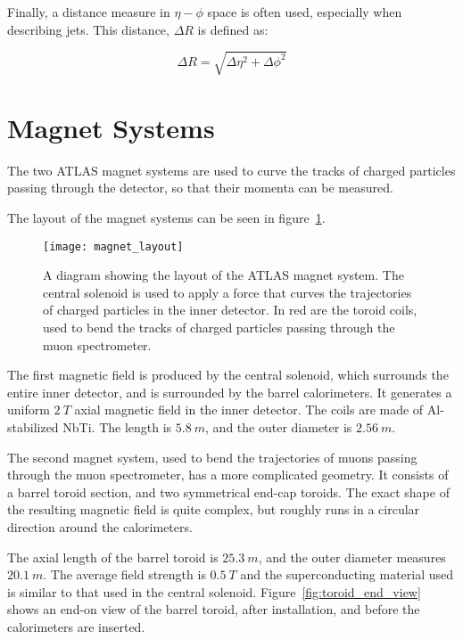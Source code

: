 Finally, a distance measure in $\eta-\phi$ space is often used, especially when describing jets.
This distance, $\Delta R$ is defined as:

\begin{equation}
\Delta R = \sqrt{\Delta\eta^2+\Delta\phi^2}
\end{equation}

\section{Magnet Systems}\label{sec:magnet_systems}
The two ATLAS magnet systems are used to curve the tracks of charged particles passing through the detector,
so that their momenta can be measured.

The layout of the magnet systems can be seen in figure~\ref{fig:magnet_layout}.

\begin{figure}[h]
\texttt{[image: magnet\_layout]}
\caption{A diagram showing the layout of the ATLAS magnet system.
The central solenoid is used to apply a force that curves the trajectories of charged particles in the inner detector.
In red are the toroid coils, used to bend the tracks of charged particles passing through the muon spectrometer.}
\label{fig:magnet_layout}
\end{figure}

The first magnetic field is produced by the central solenoid, which surrounds the entire inner detector,
and is surrounded by the barrel calorimeters.
It generates a uniform $2~T$ axial magnetic field in the inner detector.
The coils are made of Al-stabilized NbTi. The length is $5.8~m$, and the outer diameter is $2.56~m$\cite{atlas-detector-2008}.

The second magnet system, used to bend the trajectories of muons passing through the muon spectrometer,
has a more complicated geometry.
It consists of a barrel toroid section, and two symmetrical end-cap toroids.
The exact shape of the resulting magnetic field is quite complex,
but roughly runs in a circular direction around the calorimeters.

The axial length of the barrel toroid is $25.3~m$, and the outer diameter measures $20.1~m$.
The average field strength is $0.5~T$ and the superconducting material used is similar to that used in the
central solenoid\cite{atlas-detector-2008}.
Figure~\ref{fig:toroid_end_view} shows an end-on view of the barrel toroid, after installation,
and before the calorimeters are inserted.


